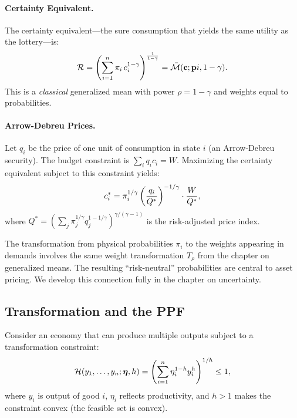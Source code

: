 \paragraph{Certainty Equivalent.}
The certainty equivalent---the sure consumption that yields the same utility as the lottery---is:
\begin{equation}
\mathcal{R} = \left( \sum_{i=1}^{n} \pi_i \, c_i^{1-\gamma} \right)^{\frac{1}{1-\gamma}} = \bar{\mathcal{M}}(\mathbf{c}; \mathbf{p}i, 1-\gamma).
\end{equation}
This is a \emph{classical} generalized mean with power $\rho = 1 - \gamma$ and weights equal to probabilities.

\paragraph{Arrow-Debreu Prices.}
Let $q_i$ be the price of one unit of consumption in state $i$ (an Arrow-Debreu security). The budget constraint is $\sum_i q_i c_i = W$. Maximizing the certainty equivalent subject to this constraint yields:
\begin{equation}
c_i^{*} = \pi_i^{1/\gamma} \left( \frac{q_i}{Q^*} \right)^{-1/\gamma} \cdot \frac{W}{Q^*},
\end{equation}
where $Q^* = (\sum_j \pi_j^{1/\gamma} q_j^{1-1/\gamma})^{\gamma/(\gamma-1)}$ is the risk-adjusted price index.

\begin{calloutimportant}
The transformation from physical probabilities $\pi_i$ to the weights appearing in demands involves the same weight transformation $T_\rho$ from the chapter on generalized means. The resulting ``risk-neutral'' probabilities are central to asset pricing. We develop this connection fully in the chapter on uncertainty.
\end{calloutimportant}

\subsection{Transformation and the PPF}
\label{subsec:transformation}

Consider an economy that can produce multiple outputs subject to a transformation constraint:
\begin{equation}
\mathcal{H}(y_1, \ldots, y_n; \boldsymbol{\eta}, h) = \left( \sum_{i=1}^{n} \eta_i^{1-h} y_i^{h} \right)^{1/h} \leq 1,
\end{equation}
where $y_i$ is output of good $i$, $\eta_i$ reflects productivity, and $h > 1$ makes the constraint convex (the feasible set is convex).

